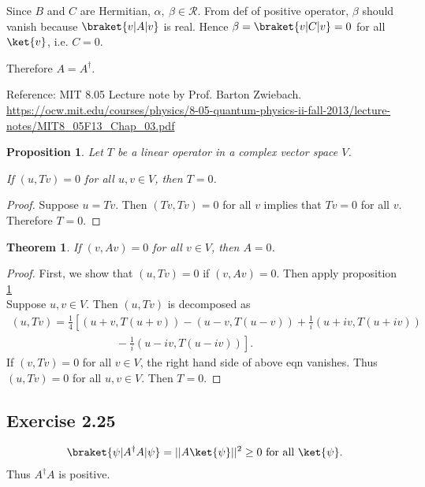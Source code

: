 \documentclass[a4paper,12pt]{article}
\newtheorem{prop}{Proposition}
\newtheorem{theorem}{Theorem}
\begin{document}
Since $B$ and $C$ are Hermitian, $\alpha,~ \beta \in \mathcal{R}$.
From def of positive operator, $\beta$ should vanish because $\braket{v | A | v}$ is real.
Hence $\beta = \braket{v | C | v} =  0$ for all $\ket{v}$, i.e. $C = 0$.

Therefore $A = A^\dagger$.


Reference: MIT 8.05 Lecture note  by Prof. Barton Zwiebach.\\
	\url{https://ocw.mit.edu/courses/physics/8-05-quantum-physics-ii-fall-2013/lecture-notes/MIT8_05F13_Chap_03.pdf}

	\begin{prop} \label{prop: zeroop}
		Let $T$ be a linear operator in a complex vector space $V$.

		If $(u, Tv) = 0$ for all $u, v \in V$, then $T = 0$.
	\end{prop}

	\begin{proof}
		Suppose $u = Tv$. Then $(Tv, Tv) = 0$ for all $v$ implies that $Tv = 0$ for all $v$. Therefore $T = 0$.
	\end{proof}

	\begin{theorem}
		If $(v, Av) = 0$ for all $v \in V$, then $A = 0$. \label{thm:zerooperator}
	\end{theorem}

	\begin{proof}
		First, we show that $(u, Tv) = 0$ if $(v, Av) = 0$. Then apply proposition \ref{prop: zeroop}\\
		Suppose $u, v \in V$. Then $(u, Tv)$ is decomposed as
		\begin{align*}
			(u, Tv) = \frac{1}{4} \left[ (u+v, T(u+v)) - (u-v, T(u-v)) + \frac{1}{i} (u+iv, T(u+iv)) \right.\\
			\left. \hspace{4cm} - \frac{1}{i} (u-iv, T(u-iv))  \right].
		\end{align*}
		If $(v, Tv) = 0$ for all $v \in V$, the right hand side of above eqn vanishes. Thus $(u, Tv) = 0$ for all $u, v \in V$.
		Then $T = 0$.
	\end{proof}



\subsection*{Exercise 2.25}
\begin{align*}
	\braket{\psi | A^\dagger A | \psi} = ||A \ket{\psi}||^2 \geq 0 \text{ for all } \ket{\psi}.
\end{align*}
Thus $A^\dagger A$ is positive.
\end{document}
